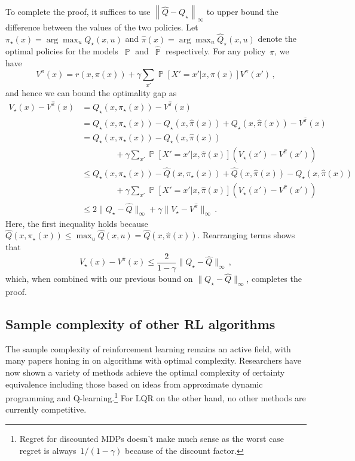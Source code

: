 \documentclass{tufte-book}
\begin{document}
To complete the proof, it suffices to use
\(\left\| \hat{Q} - Q_\star\right\|_\infty\) to upper bound the
difference between the values of the two policies. Let
\(\pi_\star(x) = \arg\max_u Q_\star(x,u)\) and
\(\hat{\pi}(x) = \arg\max_u \hat{Q}_\star(x,u)\) denote the optimal
policies for the models~\(\mathop\mathbb{P}\)
and~\(\hat{\mathop\mathbb{P}}\) respectively. For any policy~\(\pi\), we
have \[
    V^{\pi}(x) = r(x,\pi(x)) + \gamma \sum_{x'} \mathop\mathbb{P}[X'=x'|x,\pi(x)] V^\pi(x')\,,
\] and hence we can bound the optimality gap as \[
\begin{aligned}
    V_\star(x) - V^{\hat{\pi}}(x) &= Q_\star(x,\pi_\star(x)) - V^{\hat{\pi}}(x)\\
    &= Q_\star(x,\pi_\star(x)) -Q_\star(x,\hat{\pi}(x))+Q_\star(x,\hat{\pi}(x)) - V^{\hat{\pi}}(x)\\
    &= Q_\star(x,\pi_\star(x)) -Q_\star(x,\hat{\pi}(x))\\
    &\qquad\qquad+ \gamma \sum_{x'} \mathop\mathbb{P}[X'=x'|x,\hat{\pi}(x)] \left(V_\star(x') - V^{\hat{\pi}}(x') \right)\\
    &\leq Q_\star(x,\pi_\star(x)) - \hat{Q}(x,\pi_\star(x)) + \hat{Q}(x,\hat{\pi}(x)) -Q_\star(x,\hat{\pi}(x))\\
    &\qquad\qquad+ \gamma \sum_{x'} \mathop\mathbb{P}[X'=x'|x,\hat{\pi}(x)]\left(V_\star(x') - V^{\hat{\pi}}(x') \right)\\
    &\leq 2\|Q_\star- \hat{Q}\|_\infty + \gamma \|V_\star - V^{\hat{\pi}} \|_\infty\,.
\end{aligned}
\] Here, the first inequality holds because
\(\hat{Q}(x,\pi_\star(x)) \leq \max_u \hat{Q}(x,u)=\hat{Q}(x,\hat{\pi}(x))\).
Rearranging terms shows that \[
V_\star(x) - V^{\hat{\pi}}(x) \leq \frac{2}{1-\gamma}\|Q_\star- \hat{Q}\|_\infty\,,
\] which, when combined with our previous bound on
\(\|Q_\star- \hat{Q}\|_\infty\), completes the proof.

\hypertarget{sample-complexity-of-other-rl-algorithms}{%
\subsection{Sample complexity of other RL
algorithms}\label{sample-complexity-of-other-rl-algorithms}}

The sample complexity of reinforcement learning remains an active field,
with many papers honing in on algorithms with optimal complexity.
Researchers have now shown a variety of methods achieve the optimal
complexity of certainty equivalence including those based on ideas from
approximate dynamic programming and Q-learning.\footnote{Regret for
  discounted MDPs doesn't make much sense as the worst case regret is
  always~\(1/(1-\gamma)\) because of the discount factor.} For LQR on
the other hand, no other methods are currently competitive.
\end{document}
